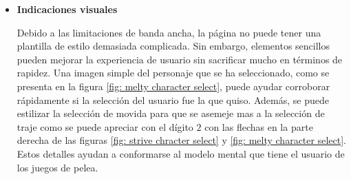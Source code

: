\begin{itemize}
    \item \textbf{Indicaciones visuales}
    
    Debido a las limitaciones de banda ancha, la página no puede tener una plantilla de estilo demasiada complicada. Sin embargo, elementos sencillos pueden mejorar la experiencia de usuario sin sacrificar mucho en términos de rapidez. Una imagen simple del personaje que se ha seleccionado, como se presenta en la figura \ref{fig: melty character select}, puede ayudar corroborar rápidamente si la selección del usuario fue la que quiso. Además, se puede estilizar la selección de movida para que se asemeje mas a la selección de traje como se puede apreciar con el dígito $2$ con las flechas en la parte derecha de las figuras \ref{fig: strive chracter select} y \ref{fig: melty character select}. Estos detalles ayudan a conformarse al modelo mental que tiene el usuario de los juegos de pelea.
\end{itemize}